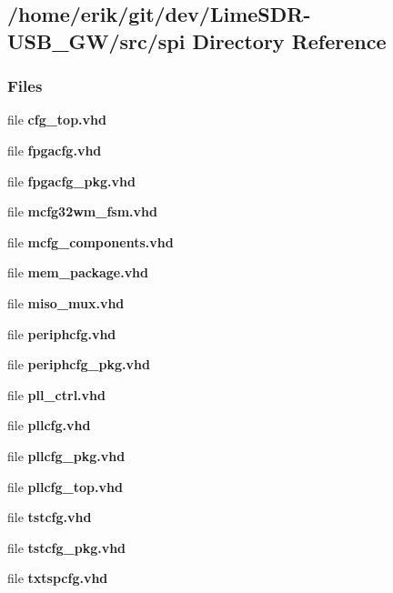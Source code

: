 \subsection{/home/erik/git/dev/\+Lime\+S\+D\+R-\/\+U\+S\+B\+\_\+\+G\+W/src/spi Directory Reference}
\label{dir_8f8e95bd6446d3295a4f7dd53d9811e5}
\subsubsection*{Files}
\begin{DoxyCompactItemize}
\item 
file {\bf cfg\+\_\+top.\+vhd}
\item 
file {\bf fpgacfg.\+vhd}
\item 
file {\bf fpgacfg\+\_\+pkg.\+vhd}
\item 
file {\bf mcfg32wm\+\_\+fsm.\+vhd}
\item 
file {\bf mcfg\+\_\+components.\+vhd}
\item 
file {\bf mem\+\_\+package.\+vhd}
\item 
file {\bf miso\+\_\+mux.\+vhd}
\item 
file {\bf periphcfg.\+vhd}
\item 
file {\bf periphcfg\+\_\+pkg.\+vhd}
\item 
file {\bf pll\+\_\+ctrl.\+vhd}
\item 
file {\bf pllcfg.\+vhd}
\item 
file {\bf pllcfg\+\_\+pkg.\+vhd}
\item 
file {\bf pllcfg\+\_\+top.\+vhd}
\item 
file {\bf tstcfg.\+vhd}
\item 
file {\bf tstcfg\+\_\+pkg.\+vhd}
\item 
file {\bf txtspcfg.\+vhd}
\end{DoxyCompactItemize}
